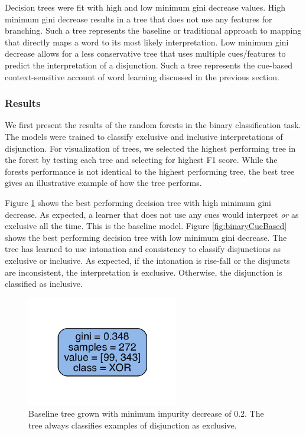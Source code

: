 \documentclass[floatsintext,man]{apa6}
\theoremstyle{definition}
\theoremstyle{definition}
\theoremstyle{definition}
\theoremstyle{remark}
\begin{document}
Decision trees were fit with high and low minimum gini decrease values.
High minimum gini decrease results in a tree that does not use any
features for branching. Such a tree represents the baseline or
traditional approach to mapping that directly maps a word to its most
likely interpretation. Low minimum gini decrease allows for a less
conservative tree that uses multiple cues/features to predict the
interpretation of a disjunction. Such a tree represents the cue-based
context-sensitive account of word learning discussed in the previous
section.

\subsubsection{Results}\label{results}

We first present the results of the random forests in the binary
classification task. The models were trained to classify exclusive and
inclusive interpretations of disjunction. For visualization of trees, we
selected the highest performing tree in the forest by testing each tree
and selecting for highest F1 score. While the forests performance is not
identical to the highest performing tree, the best tree gives an
illustrative example of how the tree performs.

Figure \ref{fig:binaryBaseline} shows the best performing decision tree
with high minimum gini decrease. As expected, a learner that does not
use any cues would interpret \emph{or} as exclusive all the time. This
is the baseline model. Figure \ref{fig:binaryCueBased} shows the best
performing decision tree with low minimum gini decrease. The tree has
learned to use intonation and consistency to classify disjunctions as
exclusive or inclusive. As expected, if the intonation is rise-fall or
the disjuncts are inconsistent, the interpretation is exclusive.
Otherwise, the disjunction is classified as inclusive.

\begin{figure}
\centering
\includegraphics{figs/binaryBaseline-1.pdf}
\caption{\label{fig:binaryBaseline}Baseline tree grown with minimum impurity
decrease of 0.2. The tree always classifies examples of disjunction as
exclusive.}
\end{figure}
\end{document}
